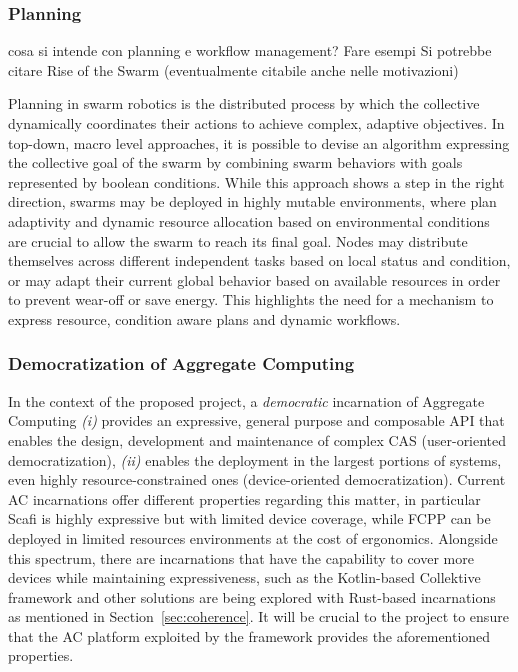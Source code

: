 \documentclass[12pt]{article}
\begin{document}
\subsubsection{Planning}
cosa si intende con planning e workflow management? Fare esempi
Si potrebbe citare Rise of the Swarm (eventualmente citabile anche nelle motivazioni)

Planning in swarm robotics is the distributed process by which the collective dynamically coordinates their actions to achieve complex, adaptive objectives.
In top-down, macro level approaches, it is possible to devise an algorithm expressing the collective goal of the swarm by combining swarm behaviors with goals represented by boolean conditions.
While this approach shows a step in the right direction, swarms may be deployed in highly mutable environments, where plan adaptivity and dynamic resource allocation based on environmental conditions
are crucial to allow the swarm to reach its final goal. Nodes may distribute themselves across different independent tasks based on local status and condition, or may adapt their current global behavior
based on available resources in order to prevent wear-off or save energy.
This highlights the need for a mechanism to express resource, condition aware plans and dynamic workflows.

\subsubsection{Democratization of Aggregate Computing}
In the context of the proposed project, a \textit{democratic} incarnation of Aggregate Computing \textit{(i)} provides an expressive, general purpose and
composable API that enables the design, development and maintenance of complex CAS (user-oriented democratization), \textit{(ii)} enables the deployment
in the largest portions of systems, even highly resource-constrained ones (device-oriented democratization). Current AC incarnations offer different properties
regarding this matter, in particular Scafi is highly expressive but with limited device coverage, while FCPP can be deployed in limited resources environments
at the cost of ergonomics. Alongside this spectrum, there are incarnations that have the capability to cover more devices while maintaining expressiveness, such as the Kotlin-based
Collektive framework and other solutions are being explored with Rust-based incarnations as mentioned in Section~\ref{sec:coherence}. It will be crucial to the project
to ensure that the AC platform exploited by the framework provides the aforementioned properties.
\end{document}
